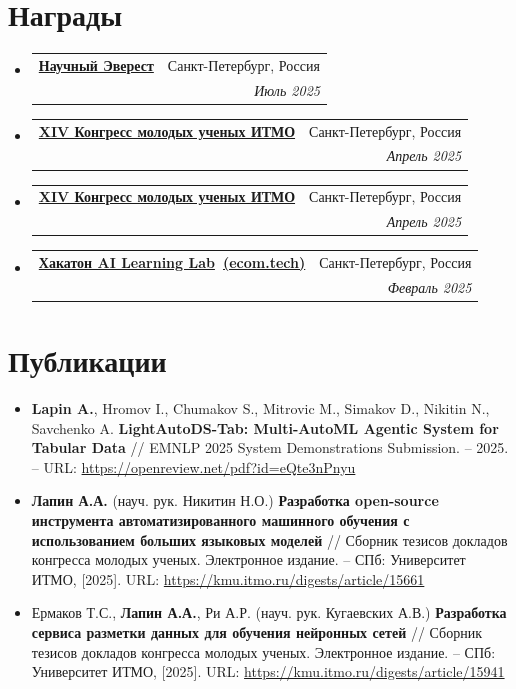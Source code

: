 \documentclass[letterpaper,11pt]{article}
\makeatletter
\newcommand{\resumeItemNoBold}[1]{
  \item\small{
    {\raggedright #1 \vspace{-2pt}}
  }
}
\newcommand{\resumeSubHeadingListStart}{\begin{itemize}[leftmargin=*]}
\newcommand{\resumeSubHeadingListEnd}{\end{itemize}}
\newcommand{\resumeItemListStart}{\begin{itemize}}
\newcommand{\resumeItemListEnd}{\end{itemize}\vspace{-5pt}}
\newcommand{\resumeAwardSubheading}[4]{
  \vspace{-1pt}\item
    \begin{tabular*}{0.97\textwidth}[t]{p{0.67\textwidth}@{\extracolsep{\fill}}r}
      \textbf{#1} & #2 \\
      \textit{\small\parbox[t]{0.67\textwidth}{\raggedright #3}} & \textit{\small #4} \\
    \end{tabular*}\vspace{-5pt}
}
\makeatother
\begin{document}
\section{Награды}
\resumeSubHeadingListStart
\resumeAwardSubheading{
    \href{https://drive.google.com/file/d/1GwysoXvcKNV9y8CfY3Toe9x6AXXRlWrU/view?usp=sharing}
    {Научный Эверест}}{Санкт-Петербург, Россия}
{\textbf{Победитель ежегодного конкурса "Научный Эверест"}. Проект "Разработка инструмента с открытым исходным кодом для автоматизированного машинного обучения на основе больших языковых моделей"}{Июль 2025}
\resumeAwardSubheading{
    \href{https://drive.google.com/file/d/1w0LCMTmXbGLRT5wyzHR6HV2Q5f1fHShN/view?usp=sharing}
    {XIV Конгресс молодых ученых ИТМО}}{Санкт-Петербург, Россия}
{\textbf{Победитель номинации "Лучший доклад молодого ученого"}. Проект "Разработка open-source инструмента автоматизированного машинного обучения с использованием больших языковых моделей"}{Апрель 2025}
\resumeAwardSubheading{
    \href{https://drive.google.com/file/d/1QIoI3PejwaDDYfFeW4Al2UtjX8WS3nBv/view?usp=sharing}
    {XIV Конгресс молодых ученых ИТМО}}{Санкт-Петербург, Россия}
{\textbf{Победитель номинации "Лучший доклад молодого ученого"}. Проект "Разработка сервиса разметки данных для обучения нейронных сетей"}{Апрель 2025}
\resumeAwardSubheading{
\href{https://drive.google.com/file/d/1gs8khjhjMai1iDpcuySTskslkZBpb5XG/view?usp=sharing}
{Хакатон AI Learning Lab}~\href{https://ecom.tech}{(ecom.tech)}}{Санкт-Петербург, Россия}
{\textbf{Победитель}. \href{https://github.com/AaLexUser/Data-annotation-service}{Разработка платформы разметки данных для повышения качества обучения нейронных сетей и внедрения современных AI моделей в пользовательские сервисы Самоката, Мегамаркета и Купера.}}{Февраль 2025}
\resumeSubHeadingListEnd

\section{Публикации}
\resumeItemListStart
\resumeItemNoBold{\textbf{Lapin A.}, Hromov I., Chumakov S., Mitrovic M., Simakov D., Nikitin N., Savchenko A. \textbf{LightAutoDS-Tab: Multi-AutoML Agentic System for Tabular Data} // EMNLP 2025 System Demonstrations Submission. – 2025. – URL: \href{https://openreview.net/pdf?id=eQte3nPnyu}{https://openreview.net/pdf?id=eQte3nPnyu}}
\resumeItemNoBold{\textbf{Лапин А.А.} (науч. рук. Никитин Н.О.) \textbf{Разработка open-source инструмента автоматизированного машинного обучения с использованием больших языковых моделей} // Сборник тезисов докладов конгресса молодых ученых. Электронное издание. – СПб: Университет ИТМО, [2025]. URL: \href{https://kmu.itmo.ru/digests/article/15661}{https://kmu.itmo.ru/digests/article/15661}}
\resumeItemNoBold{Ермаков Т.С., \textbf{Лапин А.А.}, Ри А.Р. (науч. рук. Кугаевских А.В.) \textbf{Разработка сервиса разметки данных для обучения нейронных сетей} // Сборник тезисов докладов конгресса молодых ученых. Электронное издание. – СПб: Университет ИТМО, [2025]. URL: \href{https://kmu.itmo.ru/digests/article/15941}{https://kmu.itmo.ru/digests/article/15941}}
\resumeItemListEnd
\end{document}
